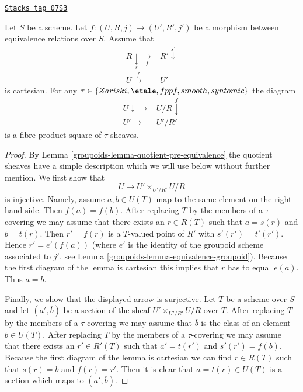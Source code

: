 \begin{lemma}
\label{groupoids-lemma-criterion-fibre-product}
\href{https://stacks.math.columbia.edu/tag/07S3}{\texttt{Stacks tag 07S3}}

Let $S$ be a scheme. Let $f : (U, R, j) \to (U', R', j')$ be a morphism
between equivalence relations over $S$. Assume that
$$
\begin{array}{cc}R \underset{s}{\downarrow}\underset{f}{\longrightarrow} & R' \overset{s'}{\downarrow} \\ U \overset{f}{\longrightarrow} & U'\end{array}
$$
is cartesian. For any
$\tau \in  \{Zariski, \etale, fppf, smooth, syntomic\}$
the diagram
$$
\begin{array}{cc}U \downarrow\longrightarrow & U/R \overset{f}{\downarrow} \\ U' \longrightarrow & U'/R'\end{array}
$$
is a fibre product square of $\tau$-sheaves.
\end{lemma}

\begin{proof}

By Lemma \ref{groupoids-lemma-quotient-pre-equivalence} the quotient sheaves
have a simple description which we will use below without further mention.
We first show that
$$
U \longrightarrow U' \times_{U'/R'} U/R
$$
is injective. Namely, assume $a, b \in U(T)$ map to the same element
on the right hand side. Then $f(a) = f(b)$. After replacing $T$ by the
members of a $\tau$-covering we may assume that there exists an
$r \in R(T)$ such that $a = s(r)$ and $b = t(r)$. Then $r' = f(r)$
is a $T$-valued point of $R'$ with $s'(r') = t'(r')$. Hence
$r' = e'(f(a))$ (where $e'$ is the identity of the groupoid
scheme associated to $j'$, see Lemma \ref{groupoids-lemma-equivalence-groupoid}).
Because the first diagram of the lemma is cartesian this implies
that $r$ has to equal $e(a)$. Thus $a = b$.

\medskip\noindent
Finally, we show that the displayed arrow is surjective. Let
$T$ be a scheme over $S$ and let $(a', \overline{b})$ be a section
of the sheaf $U' \times_{U'/R'} U/R$ over $T$. After replacing $T$
by the members of a $\tau$-covering we may assume that $\overline{b}$
is the class of an element $b \in U(T)$. After replacing $T$
by the members of a $\tau$-covering we may assume that there exists
an $r' \in R'(T)$ such that $a' = t(r')$ and $s'(r') = f(b)$.
Because the first diagram of the lemma is cartesian we can find
$r \in R(T)$ such that $s(r) = b$ and $f(r) = r'$. Then it is clear
that $a = t(r) \in U(T)$ is a section which maps to
$(a', \overline{b})$.
\end{proof}

